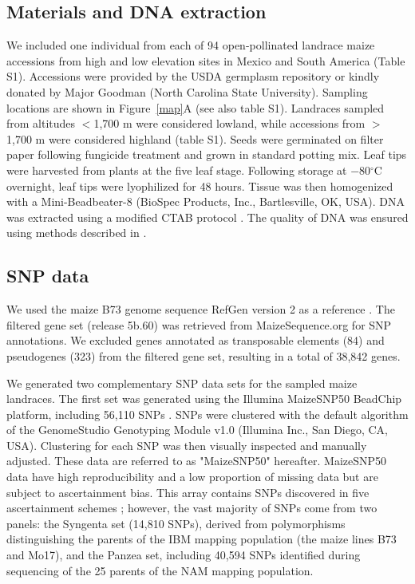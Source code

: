 \subsection*{Materials and DNA extraction}
We included one individual from each of 94 open-pollinated landrace maize accessions from high and low elevation sites in Mexico and South America (Table S1).  Accessions were provided by the USDA germplasm repository or kindly donated by Major Goodman (North Carolina State University).  
Sampling locations are shown in Figure~\ref{map}A (see also table S1).  
%
Landraces sampled from altitudes $<$1,700 m were considered lowland, while accessions from $>$1,700 m were considered highland (table S1).  
Seeds were germinated on filter paper following fungicide treatment and grown in standard potting mix.  Leaf tips were harvested from plants at the five leaf stage.  Following storage at $-80{}^\circ$C overnight, leaf tips were lyophilized for 48 hours.  Tissue was then homogenized with a Mini-Beadbeater-8 (BioSpec Products, Inc., Bartlesville, OK, USA).  DNA was extracted using a modified CTAB protocol \cite[]{CTAB}.  The quality of DNA was ensured using methods described in \cite{vanHeerwaarden_2011_21189301}.

\subsection*{SNP data}
We used the maize B73 genome sequence RefGen version 2 as a reference \cite[]{Schnable_2009_19965430}.  
The filtered gene set (release 5b.60) was retrieved from MaizeSequence.org for SNP annotations.  
We excluded genes annotated as transposable elements (84) and pseudogenes (323) from the filtered gene set, resulting in a total of 38,842 genes.

We generated two complementary SNP data sets for the sampled maize landraces. 
The first set was generated using the Illumina MaizeSNP50 BeadChip platform, including 56,110
SNPs \cite[]{Ganal_2011_22174790}.  SNPs were clustered with the default algorithm of the GenomeStudio Genotyping Module v1.0 (Illumina Inc., San Diego, CA, USA).   
Clustering for each SNP was then visually inspected and manually adjusted.  
These data are referred to as "MaizeSNP50" hereafter.  
MaizeSNP50 data have high reproducibility and a low proportion of missing data but are subject to ascertainment bias. 
This array contains SNPs discovered in five ascertainment schemes \cite[]{Ganal_2011_22174790}; however, the vast majority of SNPs come from two panels: the Syngenta set (14,810 SNPs), derived from polymorphisms distinguishing the parents of the IBM mapping population (the maize lines B73 and Mo17), and the Panzea set, including 40,594 SNPs identified during sequencing of the 25 parents of the NAM mapping population.  

